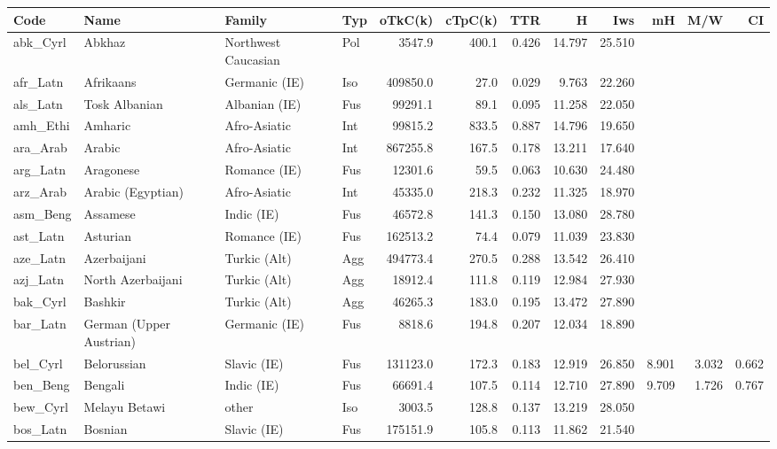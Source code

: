 \begin{tabular}{ll l l rr rr r rr r}
\toprule
Code & Name & Family & Typ & oTkC(k) & cTpC(k) & TTR & H & Iws & mH & M/W & CI \\
\midrule
abk\_Cyrl & Abkhaz & Northwest Caucasian & Pol & 3547.9 & 400.1 & 0.426 & 14.797 & 25.510 &  &  &  \\
afr\_Latn & Afrikaans & Germanic (IE) & Iso & 409850.0 & 27.0 & 0.029 & 9.763 & 22.260 &  &  &  \\
als\_Latn & Tosk Albanian & Albanian (IE) & Fus & 99291.1 & 89.1 & 0.095 & 11.258 & 22.050 &  &  &  \\
amh\_Ethi & Amharic & Afro-Asiatic & Int & 99815.2 & 833.5 & 0.887 & 14.796 & 19.650 &  &  &  \\
ara\_Arab & Arabic & Afro-Asiatic & Int & 867255.8 & 167.5 & 0.178 & 13.211 & 17.640 &  &  &  \\
arg\_Latn & Aragonese & Romance (IE) & Fus & 12301.6 & 59.5 & 0.063 & 10.630 & 24.480 &  &  &  \\
arz\_Arab & Arabic (Egyptian) & Afro-Asiatic & Int & 45335.0 & 218.3 & 0.232 & 11.325 & 18.970 &  &  &  \\
asm\_Beng & Assamese & Indic (IE) & Fus & 46572.8 & 141.3 & 0.150 & 13.080 & 28.780 &  &  &  \\
ast\_Latn & Asturian & Romance (IE) & Fus & 162513.2 & 74.4 & 0.079 & 11.039 & 23.830 &  &  &  \\
aze\_Latn & Azerbaijani & Turkic (Alt) & Agg & 494773.4 & 270.5 & 0.288 & 13.542 & 26.410 &  &  &  \\
azj\_Latn & North Azerbaijani & Turkic (Alt) & Agg & 18912.4 & 111.8 & 0.119 & 12.984 & 27.930 &  &  &  \\
bak\_Cyrl & Bashkir & Turkic (Alt) & Agg & 46265.3 & 183.0 & 0.195 & 13.472 & 27.890 &  &  &  \\
bar\_Latn & German (Upper Austrian) & Germanic (IE) & Fus & 8818.6 & 194.8 & 0.207 & 12.034 & 18.890 &  &  &  \\
bel\_Cyrl & Belorussian & Slavic (IE) & Fus & 131123.0 & 172.3 & 0.183 & 12.919 & 26.850 & 8.901 & 3.032 & 0.662 \\
ben\_Beng & Bengali & Indic (IE) & Fus & 66691.4 & 107.5 & 0.114 & 12.710 & 27.890 & 9.709 & 1.726 & 0.767 \\
bew\_Cyrl & Melayu Betawi & other & Iso & 3003.5 & 128.8 & 0.137 & 13.219 & 28.050 &  &  &  \\
bos\_Latn & Bosnian & Slavic (IE) & Fus & 175151.9 & 105.8 & 0.113 & 11.862 & 21.540 &  &  &  \\

\end{tabular}
